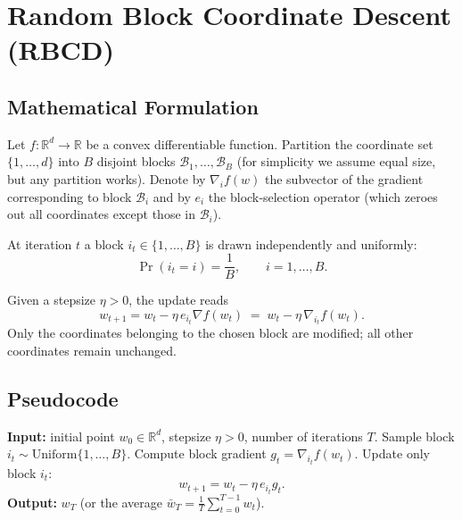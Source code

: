 \documentclass{article}
\newcommand{\R}{\mathbb{R}}
\begin{document}
\section*{Random Block Coordinate Descent (RBCD)}

\subsection*{Mathematical Formulation}
Let $f:\R^{d}\rightarrow\R$ be a convex differentiable function.  
Partition the coordinate set $\{1,\dots ,d\}$ into $B$ disjoint blocks
$\mathcal{B}_{1},\dots ,\mathcal{B}_{B}$ (for simplicity we assume equal
size, but any partition works).  
Denote by $\nabla_{i}f(w)$ the subvector of the gradient corresponding to
block $\mathcal{B}_{i}$ and by $e_{i}$ the block‑selection operator
(which zeroes out all coordinates except those in $\mathcal{B}_{i}$).

At iteration $t$ a block $i_{t}\in\{1,\dots ,B\}$ is drawn
independently and uniformly:
\[
\Pr(i_{t}=i)=\frac{1}{B},\qquad i=1,\dots ,B .
\]

Given a stepsize $\eta>0$, the update reads
\begin{equation}
\label{eq:update}
w_{t+1}=w_{t}-\eta\,e_{i_{t}}\nabla f(w_{t})\;=\; w_{t}
-\eta\,\nabla_{i_{t}}f(w_{t}) .
\end{equation}
Only the coordinates belonging to the chosen block are modified;
all other coordinates remain unchanged.

\subsection*{Pseudocode}
\begin{algorithm}[H]
\caption{Random Block Coordinate Descent}
\begin{algorithmic}[1]
\State \textbf{Input:} initial point $w_{0}\in\R^{d}$, stepsize $\eta>0$,
number of iterations $T$.
    \State Sample block $i_{t}\sim\text{Uniform}\{1,\dots ,B\}$.
    \State Compute block gradient $g_{t}= \nabla_{i_{t}}f(w_{t})$.
    \State Update only block $i_{t}$:
    \[
        w_{t+1}= w_{t}-\eta\,e_{i_{t}} g_{t}.
    \]
\EndFor
\State \textbf{Output:} $w_{T}$ (or the average $\bar w_{T}= \frac1T\sum_{t=0}^{T-1}w_{t}$).
\end{algorithmic}
\end{algorithm}
\end{document}
